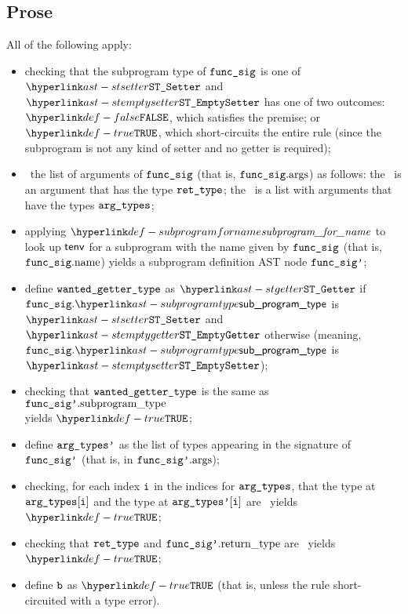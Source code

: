\subsection{Prose}
All of the following apply:
\begin{itemize}
  \item checking that the subprogram type of $\texttt{func\_sig}$ is one of $\STSetter$ and \\ $\STEmptySetter$
        has one of two outcomes:
        $\False$, which satisfies the premise;
        or $\True$, which short-circuits the entire rule
        (since the subprogram is not any kind of setter and no getter is required);
  \item \view\ the list of arguments of $\texttt{func\_sig}$ (that is, $\texttt{func\_sig}.\text{args}$) as follows:
        the \head\ is an argument that has the type $\texttt{ret\_type}$;
        the \tail\ is a list with arguments that have the types $\texttt{arg\_types}$;
  \item applying $\subprogramforname$ to look up $\textsf{tenv}$ for a subprogram with the name given by $\texttt{func\_sig}$ (that is, $\texttt{func\_sig}.\text{name}$)
        yields a subprogram definition AST node $\texttt{func\_sig'}$\ProseOrTypeError;
  \item define $\texttt{wanted\_getter\_type}$ as $\STGetter$ if $\funcsig.\subprogramtype$ is \\ $\STSetter$ and
        $\STEmptyGetter$ otherwise (meaning, $\funcsig.\subprogramtype$ is $\STEmptySetter$);
  \item checking that $\texttt{wanted\_getter\_type}$ is the same as $\texttt{func\_sig'}.\text{subprogram\_type}$ \\ yields $\True$\ProseOrTypeError;
  \item define $\texttt{arg\_types'}$ as the list of types appearing in the signature of $\texttt{func\_sig'}$ (that is, in $\texttt{func\_sig'}.\text{args}$);
  \item checking, for each index $\texttt{i}$ in the indices for $\texttt{arg\_types}$, that the type at $\texttt{arg\_types}[\texttt{i}]$ and the type at $\texttt{arg\_types'}[\texttt{i}]$
        are \typeequivalent\ yields $\True$\ProseOrTypeError;
  \item checking that $\texttt{ret\_type}$ and $\texttt{func\_sig'}.\text{return\_type}$ are \typeequivalent\ yields \\
        $\True$\ProseOrTypeError;
  \item define $\texttt{b}$ as $\True$ (that is, unless the rule short-circuited with a type error).
\end{itemize}


